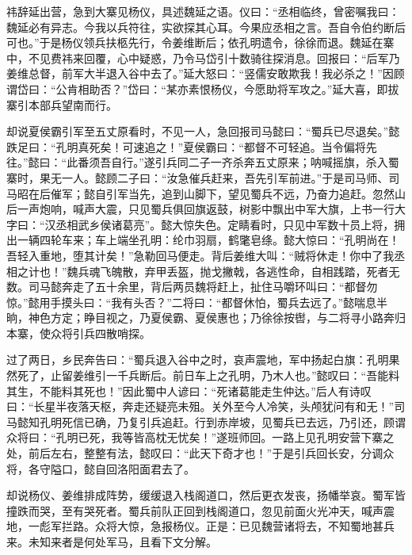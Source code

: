 祎辞延出营，急到大寨见杨仪，具述魏延之语。仪曰：“丞相临终，曾密嘱我曰：魏延必有异志。今我以兵符往，实欲探其心耳。今果应丞相之言。吾自令伯约断后可也。”于是杨仪领兵扶柩先行，令姜维断后；依孔明遗令，徐徐而退。魏延在寨中，不见费祎来回覆，心中疑惑，乃令马岱引十数骑往探消息。回报曰：“后军乃姜维总督，前军大半退入谷中去了。”延大怒曰：“竖儒安敢欺我！我必杀之！”因顾谓岱曰：“公肯相助否？”岱曰：“某亦素恨杨仪，今愿助将军攻之。”延大喜，即拔寨引本部兵望南而行。

却说夏侯霸引军至五丈原看时，不见一人，急回报司马懿曰：“蜀兵已尽退矣。”懿跌足曰：“孔明真死矣！可速追之！”夏侯霸曰：“都督不可轻追。当令偏将先往。”懿曰：“此番须吾自行。”遂引兵同二子一齐杀奔五丈原来；呐喊摇旗，杀入蜀寨时，果无一人。懿顾二子曰：“汝急催兵赶来，吾先引军前进。”于是司马师、司马昭在后催军；懿自引军当先，追到山脚下，望见蜀兵不远，乃奋力追赶。忽然山后一声炮响，喊声大震，只见蜀兵俱回旗返鼓，树影中飘出中军大旗，上书一行大字曰：“汉丞相武乡侯诸葛亮”。懿大惊失色。定睛看时，只见中军数十员上将，拥出一辆四轮车来；车上端坐孔明：纶巾羽扇，鹤氅皂绦。懿大惊曰：“孔明尚在！吾轻入重地，堕其计矣！”急勒回马便走。背后姜维大叫：“贼将休走！你中了我丞相之计也！”魏兵魂飞魄散，弃甲丢盔，抛戈撇戟，各逃性命，自相践踏，死者无数。司马懿奔走了五十余里，背后两员魏将赶上，扯住马嚼环叫曰：“都督勿惊。”懿用手摸头曰：“我有头否？”二将曰：“都督休怕，蜀兵去远了。”懿喘息半晌，神色方定；睁目视之，乃夏侯霸、夏侯惠也；乃徐徐按辔，与二将寻小路奔归本寨，使众将引兵四散哨探。

过了两日，乡民奔告曰：“蜀兵退入谷中之时，哀声震地，军中扬起白旗：孔明果然死了，止留姜维引一千兵断后。前日车上之孔明，乃木人也。”懿叹曰：“吾能料其生，不能料其死也！”因此蜀中人谚曰：“死诸葛能走生仲达。”后人有诗叹曰：“长星半夜落天枢，奔走还疑亮未殂。关外至今人冷笑，头颅犹问有和无！”司马懿知孔明死信已确，乃复引兵追赶。行到赤岸坡，见蜀兵已去远，乃引还，顾谓众将曰：“孔明已死，我等皆高枕无忧矣！”遂班师回。一路上见孔明安营下寨之处，前后左右，整整有法，懿叹曰：“此天下奇才也！”于是引兵回长安，分调众将，各守隘口，懿自回洛阳面君去了。

却说杨仪、姜维排成阵势，缓缓退入栈阁道口，然后更衣发丧，扬幡举哀。蜀军皆撞跌而哭，至有哭死者。蜀兵前队正回到栈阁道口，忽见前面火光冲天，喊声震地，一彪军拦路。众将大惊，急报杨仪。正是：已见魏营诸将去，不知蜀地甚兵来。未知来者是何处军马，且看下文分解。